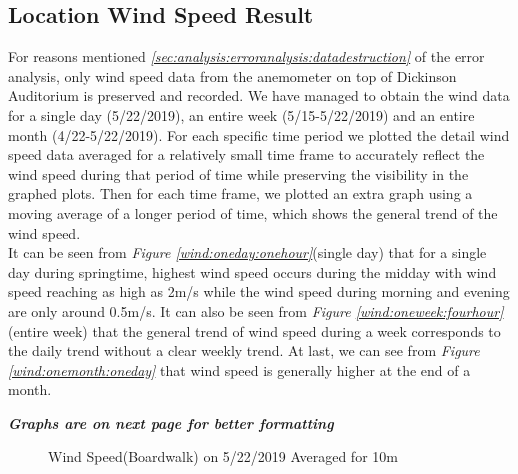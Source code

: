 \documentclass[review]{elsarticle}
\begin{document}
\clearpage
\subsection{Location Wind Speed Result}
\label{sec:results:locwindspeedresults}
For reasons mentioned \textit{\ref{sec:analysis:erroranalysis:datadestruction}}  of the error analysis, only wind speed data from the 
anemometer on top of Dickinson Auditorium is preserved and recorded. We have managed to obtain the wind data for a single day (5/22/2019), 
an entire week (5/15-5/22/2019) and an entire month (4/22-5/22/2019). For each specific time period we plotted the detail wind speed data 
averaged for a relatively small time frame to accurately reflect the wind speed during that period of time while preserving the visibility 
in the graphed plots. Then for each time frame, we plotted an extra graph using a moving average of a longer period of time, which shows 
the general trend of the wind speed.
\\\indent It can be seen from \textit{Figure \ref{wind:oneday:onehour}}(single day) that for a single day during springtime, highest wind 
speed occurs during the midday with wind speed reaching as high as 2m/s while the wind speed during morning and evening are only around 0.5m/s. 
It can also be seen from \textit{Figure \ref{wind:oneweek:fourhour}}(entire week) that the general trend of wind speed during a week corresponds 
to the daily trend without a clear weekly trend. At last, we can see from \textit{Figure \ref{wind:onemonth:oneday}} that wind speed is generally 
higher at the end of a month.


\vspace{100pt}
\textit{\textbf{Graphs are on next page for better formatting}}

\clearpage


\begin{figure}
    \caption{Wind Speed(Boardwalk) on 5/22/2019 Averaged for 10m}
    \label{wind:oneday:tenminutes}
\end{figure}
\end{document}
